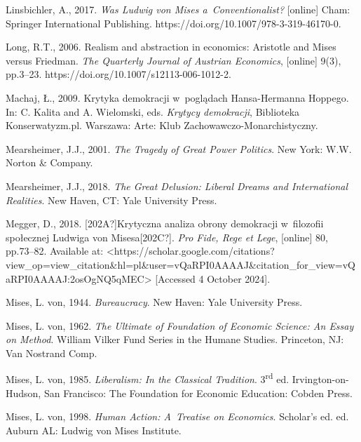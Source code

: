 Linsbichler, A., 2017. \textit{Was Ludwig von Mises a~Conventionalist?} [online] Cham: Springer International Publishing. https://doi.org/10.1007/978-3-319-46170-0.



Long, R.T., 2006. Realism and abstraction in economics: Aristotle and Mises versus Friedman. \textit{The Quarterly Journal of Austrian Economics}, [online] 9(3), pp.3–23. https://doi.org/10.1007/s12113-006-1012-2.



Machaj, Ł., 2009. Krytyka demokracji w~poglądach Hansa-Hermanna Hoppego. In: C. Kalita and A. Wielomski, eds. \textit{Krytycy demokracji}, Biblioteka Konserwatyzm.pl. Warszawa: Arte: Klub Zachowawczo-Monarchistyczny.



Mearsheimer, J.J., 2001. \textit{The Tragedy of Great Power Politics}. New York: W.W. Norton \& Company.



Mearsheimer, J.J., 2018. \textit{The Great Delusion: Liberal Dreams and International Realities}. New Haven, CT: Yale University Press.



Megger, D., 2018. [202A?]Krytyczna analiza obrony demokracji w~filozofii społecznej Ludwiga von Misesa[202C?]. \textit{Pro Fide, Rege et Lege}, [online] 80, pp.73–82. Available at: {\textless}https://scholar.google.com/citations?view\_op=view\_citation\&hl=pl\&user=vQaRPI0AAAAJ\&citation\_for\_view=vQaRPI0AAAAJ:2osOgNQ5qMEC{\textgreater} [Accessed 4 October 2024].



Mises, L. von, 1944. \textit{Bureaucracy}. New Haven: Yale University Press.



Mises, L. von, 1962. \textit{The Ultimate of Foundation of Economic Science: An Essay on Method}. William Vilker Fund Series in the Humane Studies. Princeton, NJ: Van Nostrand Comp.



Mises, L. von, 1985. \textit{Liberalism: In the Classical Tradition}. 3\textsuperscript{rd} ed. Irvington-on-Hudson, San Francisco: The Foundation for Economic Education: Cobden Press.



Mises, L. von, 1998. \textit{Human Action: A~Treatise on Economics}. Scholar's ed. ed. Auburn AL: Ludwig von Mises Institute.



